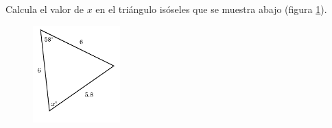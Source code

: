 \question[15]  Calcula el valor de $x$ en el triángulo isóseles  que se muestra abajo (figura \ref{fig:findangle11}).
\begin{figure}[H]
    \begin{center}
        \includegraphics[width=0.3\textwidth]{../images/findangle11.png}
    \end{center}
    \caption{}
    \label{fig:findangle11}
\end{figure}